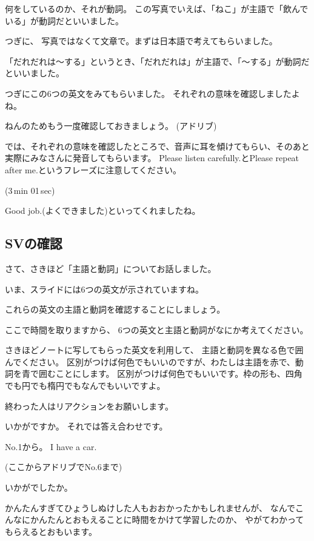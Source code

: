 \documentclass[12pt]{jlreq}
\begin{document}
何をしているのか、それが動詞。
この写真でいえば、「ねこ」が主語で「飲んでいる」が動詞だといいました。

{\large \ComputerMouse}

つぎに、
写真ではなくて文章で。まずは日本語で考えてもらいました。

「だれだれは〜する」というとき、「だれだれは」が主語で、「〜する」が動詞だといいました。

{\large \ComputerMouse}

つぎにこの6つの英文をみてもらいました。
それぞれの意味を確認しましたよね。

ねんのためもう一度確認しておきましょう。
(アドリブ)

では、それぞれの意味を確認したところで、音声に耳を傾けてもらい、そのあと実際にみなさんに発音してもらいます。
Please listen carefully.とPlease repeat after me.というフレーズに注意してください。





\faVolumeUp{}(3\,min 01\,sec)

Good job.(よくできました)といってくれましたね。


\subsection{SVの確認}

さて、さきほど「主語と動詞」についてお話しました。

いま、スライドには6つの英文が示されていますね。

これらの英文の主語と動詞を確認することにしましょう。

ここで時間を取りますから、
6つの英文と主語と動詞がなにか考えてください。

さきほどノートに写してもらった英文を利用して、
主語と動詞を異なる色で囲んでください。
区別がつけば何色でもいいのですが、わたしは主語を赤で、動詞を青で囲むことにします。
区別がつけば何色でもいいです。枠の形も、四角でも円でも楕円でもなんでもいいですよ。

終わった人はリアクションをお願いします。

いかがですか。
それでは答え合わせです。

No.1から。
I have a car.

(ここからアドリブでNo.6まで)

いかがでしたか。

かんたんすぎてひょうしぬけした人もおおかったかもしれませんが、
なんでこんなにかんたんとおもえることに時間をかけて学習したのか、
やがてわかってもらえるとおもいます。
\end{document}
